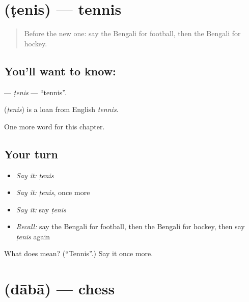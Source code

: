 \section[\texorpdfstring{\bn{টেনিস} (ṭenis)}{টেনিস (ṭenis)}]{ (ṭenis) — tennis}

\label{lesson:BN-C197-tenis}



\begin{quote}
Before the new one: say the Bengali for football, then the Bengali for hockey.
\end{quote}

\subsection*{You'll want to know: }
\textbf{} — \emph{ṭenis} — \textquotedblleft{}tennis\textquotedblright{}.

\begin{cousinweb}
\textbf{} (\emph{ṭenis}) is a loan from English \emph{tennis}.
\end{cousinweb}

\begin{grammarlens}[title={What you've built}]
One more word for this chapter.
\end{grammarlens}

\subsection*{Your turn}
\begin{itemize}
\raggedright
  \item \emph{Say it:} \emph{ṭenis}
  \item \emph{Say it:} \emph{ṭenis}, once more
  \item \emph{Say it:} say \emph{ṭenis}
  \item \emph{Recall:} say the Bengali for football, then the Bengali for hockey, then say \emph{ṭenis} again
\end{itemize}

\begin{tcolorbox}[breakable,colback=teal!4,colframe=teal!35!black,title={Before you move on}]
What does  mean? (\textquotedblleft{}Tennis\textquotedblright{}.) Say it once more.
\end{tcolorbox}
\section[\texorpdfstring{\bn{দাবা} (dābā)}{দাবা (dābā)}]{ (dābā) — chess}


